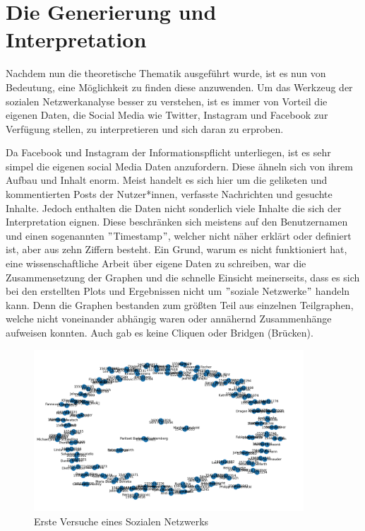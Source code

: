 \chapter{Die Generierung und Interpretation}\label{ch:generierung}
Nachdem nun die theoretische Thematik ausgeführt wurde, ist es nun von Bedeutung, eine Möglichkeit zu finden diese anzuwenden. 
Um das Werkzeug der sozialen Netzwerkanalyse besser zu verstehen, ist es immer von Vorteil die eigenen Daten, die Social Media wie Twitter, Instagram und Facebook zur Verfügung stellen, zu interpretieren und sich daran zu erproben. 

Da Facebook und Instagram der Informationspflicht unterliegen, ist es sehr simpel die eigenen social Media Daten anzufordern. Diese ähneln sich von ihrem Aufbau und Inhalt enorm. Meist handelt es sich hier um die geliketen und kommentierten Posts der Nutzer*innen, verfasste Nachrichten und gesuchte Inhalte. Jedoch enthalten die Daten nicht sonderlich viele Inhalte die sich der Interpretation eignen. Diese beschränken sich meistens auf den Benutzernamen und einen sogenannten $"$Timestamp$"$, welcher nicht näher erklärt oder definiert ist, aber aus zehn Ziffern besteht.
Ein Grund, warum es nicht funktioniert hat, eine wissenschaftliche Arbeit über eigene Daten zu schreiben, war die Zusammensetzung der Graphen und die schnelle Einsicht meinerseits, dass es sich bei den erstellten Plots und Ergebnissen nicht um $"$soziale Netzwerke$"$ handeln kann.
Denn die Graphen bestanden zum größten Teil aus einzelnen Teilgraphen, welche nicht voneinander abhängig waren oder annähernd Zusammenhänge aufweisen konnten. Auch gab es keine Cliquen oder Bridgen (Brücken). \\
\FloatBarrier
\begin{figure}[h!]
    \centering
    \includegraphics[width=0.9\textwidth]{Graphics/PlotOwnData.png}
    \caption{Erste Versuche eines Sozialen Netzwerks}
    \label{fig:OwnData}
\end{figure}
\FloatBarrier

